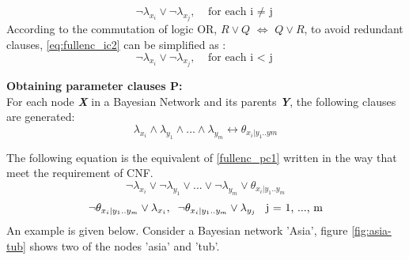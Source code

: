             \begin{equation}\label{eq:fullenc_ic2}
                \neg\lambda_{x_{i}} \vee \neg\lambda_{x_{j}}, \;\;\; \mbox{for each i $\neq$ j}
            \end{equation}
            According to the commutation of logic OR, $R \vee Q$ $\Longleftrightarrow$ $Q \vee R$, to avoid redundant clauses, \ref{eq:fullenc_ic2} can be simplified as :
            \begin{equation}\label{fullenc_ic3}
                \neg\lambda_{x_{i}} \vee \neg\lambda_{x_{j}}, \;\;\; \mbox{for each i $<$ j}
            \end{equation}
            
            \noindent \textbf{Obtaining parameter clauses \textsc{P}:}\\
            For each node \textbf{\textit{X}} in a Bayesian Network and its parents \textbf{\textit{Y}}, the following clauses are generated:
            \begin{equation}\label{fullenc_pc1}
                \lambda_{x_{i}} \wedge \lambda_{y_{1}} \wedge... \wedge \lambda_{y_{m}} \leftrightarrow \theta_{x_{i}|y_{1}..y{m}}
            \end{equation}
            
           \noindent The following equation is the equivalent of \ref{fullenc_pc1} written in the way that meet the requirement of CNF.
            \begin{equation}\label{fullenc_IP}
                \neg\lambda_{x_{i}} \vee \neg\lambda_{y_{1}} \vee... \vee \neg\lambda_{y_{m}} \vee \theta_{x_{i}|y_{1}..y_{m}}
            \end{equation}
            \begin{equation}\label{fullenc_PI}
                \neg\theta_{x_{i}|y_{1}..y_{m}} \vee \lambda_{x_{i}},\\ \;\;
                \neg\theta_{x_{i}|y_{1}..y_{m}} \vee \lambda_{y_{j}} \;\; \mbox{ j = 1, ..., m}
            \end{equation}
            An example is given below. Consider a Bayesian network 'Asia', figure \ref{fig:asia-tub} shows two of the nodes 'asia' and 'tub'.
            
